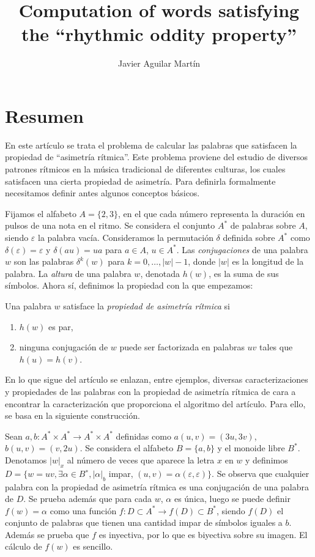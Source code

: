 \documentclass[twoside]{article}
\begin{document}
\title{Computation of words satisfying the “rhythmic oddity property”}
\author{Javier Aguilar Martín}
\maketitle

\section{Resumen}

En este artículo se trata el problema de calcular las palabras que satisfacen la propiedad de ``asimetría rítmica''. Este problema proviene del estudio de diversos patrones rítmicos en la música tradicional de diferentes culturas, los cuales satisfacen una cierta propiedad de asimetría. Para definirla formalmente necesitamos definir antes algunos conceptos básicos.

Fijamos el alfabeto $A=\{2,3\}$, en el que cada número representa la duración en pulsos de una nota en el ritmo. Se considera el conjunto $A^*$ de palabras sobre $A$, siendo $\varepsilon$ la palabra vacía. Consideramos la permutación $\delta$ definida sobre $A^*$ como $\delta(\varepsilon)=\varepsilon$ y $\delta(au)=ua$ para $a\in A$, $u\in A^*$. Las \emph{conjugaciones} de una palabra $w$ son las palabras $\delta^k(w)$ para $k=0,\dots, |w|-1$, donde $|w|$ es la longitud de la palabra. La \emph{altura} de una palabra $w$, denotada $h(w)$, es la suma de sus símbolos. Ahora sí, definimos la propiedad con la que empezamos:

\begin{defi}
Una palabra $w$ satisface la \emph{propiedad de asimetría rítmica} si
\begin{enumerate}
\item $h(w)$ es par,
\item ninguna conjugación de $w$ puede ser factorizada en palabras $uv$ tales que $h(u)=h(v)$. 
\end{enumerate}
\end{defi}

En lo que sigue del artículo se enlazan, entre ejemplos, diversas caracterizaciones y propiedades de las palabras con la propiedad de asimetría rítmica de cara a encontrar la caracterización que proporciona el algoritmo del artículo. Para ello, se basa en la siguiente construcción.

Sean $a,b:A^*\times A^*\to A^*\times A^*$ definidas como $a(u,v)=(3u,3v)$, $b(u,v)=(v,2u)$. Se considera el alfabeto $B=\{a,b\}$ y el monoide libre $B^*$. Denotamos $|w|_x$ al número de veces que aparece la letra $x$ en $w$ y definimos $D=\{w = uv, ∃α ∈ B^∗
, |α|_b $ impar, $(u,v) = α(ε, ε)\}$. Se observa que cualquier palabra con la propiedad de asimetría rítmica es una conjugación de una palabra de $D$. Se prueba además que para cada $w$, $\alpha$ es única, luego se puede definir $f(w)=\alpha$ como una función $f:D\subset A^*\to f(D)\subset B^*$, siendo $f(D)$ el conjunto de palabras que tienen una cantidad impar de símbolos iguales a $b$. Además se prueba que $f$ es inyectiva, por lo que es biyectiva sobre su imagen. El cálculo de $f(w)$ es sencillo.\\
\end{document}
